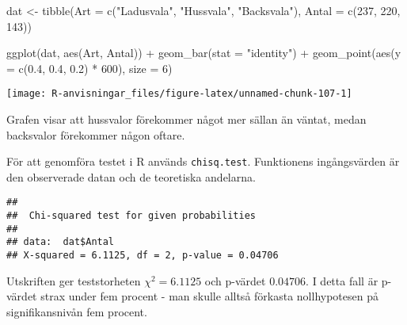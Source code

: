 \documentclass[
]{book}
\newenvironment{Shaded}{\begin{snugshade}}{\end{snugshade}}
\newcommand{\AttributeTok}[1]{\textcolor[rgb]{0.77,0.63,0.00}{#1}}
\newcommand{\DecValTok}[1]{\textcolor[rgb]{0.00,0.00,0.81}{#1}}
\newcommand{\FloatTok}[1]{\textcolor[rgb]{0.00,0.00,0.81}{#1}}
\newcommand{\FunctionTok}[1]{\textcolor[rgb]{0.00,0.00,0.00}{#1}}
\newcommand{\NormalTok}[1]{#1}
\newcommand{\OtherTok}[1]{\textcolor[rgb]{0.56,0.35,0.01}{#1}}
\newcommand{\SpecialCharTok}[1]{\textcolor[rgb]{0.00,0.00,0.00}{#1}}
\newcommand{\StringTok}[1]{\textcolor[rgb]{0.31,0.60,0.02}{#1}}
\theoremstyle{definition}
\theoremstyle{definition}
\theoremstyle{definition}
\theoremstyle{definition}
\theoremstyle{remark}
\begin{document}
\begin{Shaded}
\begin{Highlighting}[]
\NormalTok{dat }\OtherTok{\textless{}{-}} \FunctionTok{tibble}\NormalTok{(}\AttributeTok{Art =} \FunctionTok{c}\NormalTok{(}\StringTok{"Ladusvala"}\NormalTok{, }\StringTok{"Hussvala"}\NormalTok{, }\StringTok{"Backsvala"}\NormalTok{),}
              \AttributeTok{Antal =} \FunctionTok{c}\NormalTok{(}\DecValTok{237}\NormalTok{, }\DecValTok{220}\NormalTok{, }\DecValTok{143}\NormalTok{))}

\FunctionTok{ggplot}\NormalTok{(dat, }\FunctionTok{aes}\NormalTok{(Art, Antal)) }\SpecialCharTok{+}
  \FunctionTok{geom\_bar}\NormalTok{(}\AttributeTok{stat =} \StringTok{"identity"}\NormalTok{) }\SpecialCharTok{+}
  \FunctionTok{geom\_point}\NormalTok{(}\FunctionTok{aes}\NormalTok{(}\AttributeTok{y =} \FunctionTok{c}\NormalTok{(}\FloatTok{0.4}\NormalTok{, }\FloatTok{0.4}\NormalTok{, }\FloatTok{0.2}\NormalTok{) }\SpecialCharTok{*} \DecValTok{600}\NormalTok{), }\AttributeTok{size =} \DecValTok{6}\NormalTok{)}
\end{Highlighting}
\end{Shaded}

\begin{center}\texttt{[image: R-anvisningar\_files/figure-latex/unnamed-chunk-107-1]} \end{center}

Grafen visar att hussvalor förekommer något mer sällan än väntat, medan backsvalor förekommer någon oftare.

För att genomföra testet i R används \texttt{chisq.test}. Funktionens ingångsvärden är den observerade datan och de teoretiska andelarna.

\begin{Shaded}
\end{Shaded}

\begin{verbatim}
## 
##  Chi-squared test for given probabilities
## 
## data:  dat$Antal
## X-squared = 6.1125, df = 2, p-value = 0.04706
\end{verbatim}

Utskriften ger teststorheten \(\chi^2 = 6.1125\) och p-värdet \(0.04706\). I detta fall är p-värdet strax under fem procent - man skulle alltså förkasta nollhypotesen på signifikansnivån fem procent.
\end{document}

